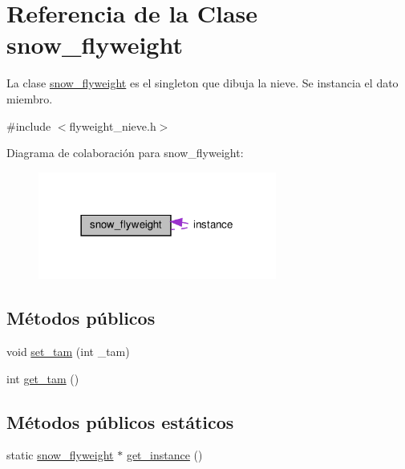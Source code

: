 \hypertarget{classsnow__flyweight}{}\section{Referencia de la Clase snow\+\_\+flyweight}
\label{classsnow__flyweight}


La clase \hyperlink{classsnow__flyweight}{snow\+\_\+flyweight} es el singleton que dibuja la nieve.  Se instancia el dato miembro.  




{\ttfamily \#include $<$flyweight\+\_\+nieve.\+h$>$}



Diagrama de colaboración para snow\+\_\+flyweight\+:
\nopagebreak
\begin{figure}[H]
\begin{center}
\leavevmode
\includegraphics[width=222pt]{classsnow__flyweight__coll__graph}
\end{center}
\end{figure}
\subsection*{Métodos públicos}
\begin{DoxyCompactItemize}
\item 
void \hyperlink{classsnow__flyweight_aaf41210615d014dbd8d679cc7a48003e}{set\+\_\+tam} (int \+\_\+tam)
\item 
int \hyperlink{classsnow__flyweight_a64f410373e401b52629c93bf917b4b41}{get\+\_\+tam} ()
\end{DoxyCompactItemize}
\subsection*{Métodos públicos estáticos}
\begin{DoxyCompactItemize}
\item 
static \hyperlink{classsnow__flyweight}{snow\+\_\+flyweight} $\ast$ \hyperlink{classsnow__flyweight_a6035abfd67cce3ff166a5c9fc00e286c}{get\+\_\+instance} ()
\end{DoxyCompactItemize}

